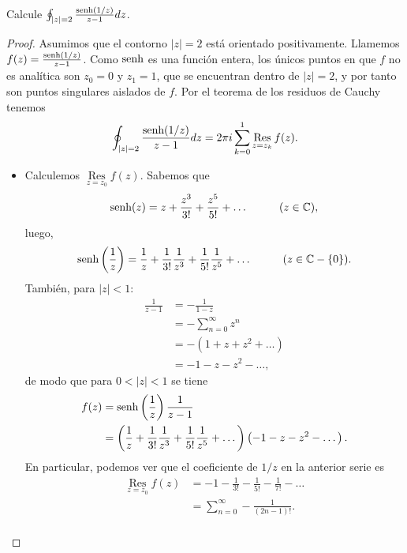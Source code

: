 \begin{Ejc}
   Calcule $\oint _{|z|=2}\frac{\normalfont{\text{senh}} (1/z)}{z-1}dz$.
\end{Ejc}
\begin{proof}
   Asumimos que el contorno $|z|=2$ está orientado positivamente. Llamemos $f(z)=\frac{\normalfont{\text{senh}}(1/z)}{z-1}$. Como $\normalfont{\text{senh}}$ es una función entera, los únicos puntos en que $f$ no es analítica son $z_0=0$ y $z_1=1$, que se encuentran dentro de $|z|=2$, y por tanto son puntos singulares aislados de $f$. Por el teorema de los residuos de Cauchy tenemos
   $$
   \oint _{|z|=2}\frac{\normalfont{\text{senh}} (1/z)}{z-1}dz=2\pi i \sum_{k=0}^{1}\mathop{\mathrm{Res}}\limits_{z=z_k}f(z).
   $$
  \begin{itemize}
     \item Calculemos $\mathop{\mathrm{Res}}\limits_{z=z_0}f(z)$. Sabemos que
        $$
        \normalfont{\text{senh}} (z) = z+\frac{z^3}{3!}+\frac{z^5}{5!}+\dots \hspace{1cm}(z\in\mathbb{C}),
        $$
        luego,
        $$
        \normalfont{\text{senh}}\left(\frac{1}{z} \right)=\frac{1}{z}+\frac{1}{3!}\frac{1}{z^3}+\frac{1}{5!}\frac{1}{z^5}+\dots \hspace{1cm}(z\in\mathbb{C}-\left\lbrace 0\right\rbrace).
        $$
        También, para $|z|<1$:
        $$
        \begin{aligned}
           \frac{1}{z-1}&=-\frac{1}{1-z}\\
                        &=-\sum_{n=0}^{\infty}z^n\\
                        &=-(1+z+z^2+\dots)\\
                        &=-1-z-z^2-\dots,
        \end{aligned}
        $$
        de modo que para $0<|z|<1$ se tiene
        $$
        \begin{aligned}
           f(z)&=\normalfont{\text{senh}}\left( \frac{1}{z}\right)\frac{1}{z-1}\\
               &=\left( \frac{1}{z}+\frac{1}{3!}\frac{1}{z^3}+\frac{1}{5!}\frac{1}{z^5}+\dots\right)\left( -1-z-z^2-\dots\right).
        \end{aligned}
        $$
        En particular, podemos ver que el coeficiente de $1/z$ en la anterior serie es
        $$
        \begin{aligned}
           \mathop{\mathrm{Res}}\limits_{z=z_0}f(z)&=-1-\frac{1}{3!}-\frac{1}{5!}-\frac{1}{7!}-\dots\\
           &=\sum_{n=0}^{\infty}-\frac{1}{(2n-1)!}.\\
        \end{aligned}
$$
\end{itemize}
\end{proof}
